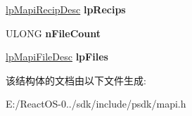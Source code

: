 \begin{DoxyCompactItemize}
\item 
\mbox{\label{struct_mapi_message_a0fb431c1c105767840d186f05da19580}} 
\hyperlink{struct_mapi_recip_desc}{lp\+Mapi\+Recip\+Desc} {\bfseries lp\+Recips}
\item 
\mbox{\label{struct_mapi_message_a5fb9af38699649a98b3629a4d01fa472}} 
U\+L\+O\+NG {\bfseries n\+File\+Count}
\item 
\mbox{\label{struct_mapi_message_af7e4e58b6ea96f19a34145b08168741d}} 
\hyperlink{struct_mapi_file_desc}{lp\+Mapi\+File\+Desc} {\bfseries lp\+Files}
\end{DoxyCompactItemize}


该结构体的文档由以下文件生成\+:\begin{DoxyCompactItemize}
\item 
E\+:/\+React\+O\+S-\/0../sdk/include/psdk/mapi.\+h\end{DoxyCompactItemize}
